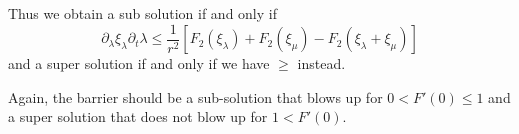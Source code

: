 \documentclass{amsart}
\begin{document}
Thus we obtain a sub solution if and only if
\[
\partial_{\lambda} \xi_{\lambda} \partial_t \lambda \leq \frac{1}{r^2}\left[F_2(\xi_{\lambda}) + F_2(\xi_{\mu}) - F_2(\xi_{\lambda} + \xi_{\mu})\right]
\]
and a super solution if and only if we have \(\geq\) instead.

{\color{red}Again, the barrier should be a sub-solution that blows up for \(0 < F'(0) \leq 1\)  and a super solution that does not blow up for \(1 < F'(0)\).}
\end{document}
